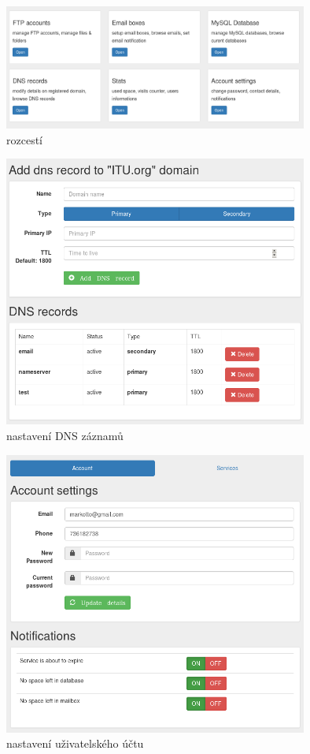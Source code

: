 \documentclass[11pt,a4paper]{article}
\begin{document}
      \begin{figure}[ht]
        \begin{center}
          \includegraphics[width=10cm]{dashboard}
          \caption{rozcestí}
        \end{center}
      \end{figure}

      \begin{figure}[ht]
        \begin{center}
          \includegraphics[width=10cm]{dns}
          \caption{nastavení DNS záznamů}
        \end{center}
      \end{figure}

      \begin{figure}[ht]
        \begin{center}
          \includegraphics[width=10cm]{acc}
          \caption{nastavení uživatelského účtu}
        \end{center}
      \end{figure}
\end{document}
